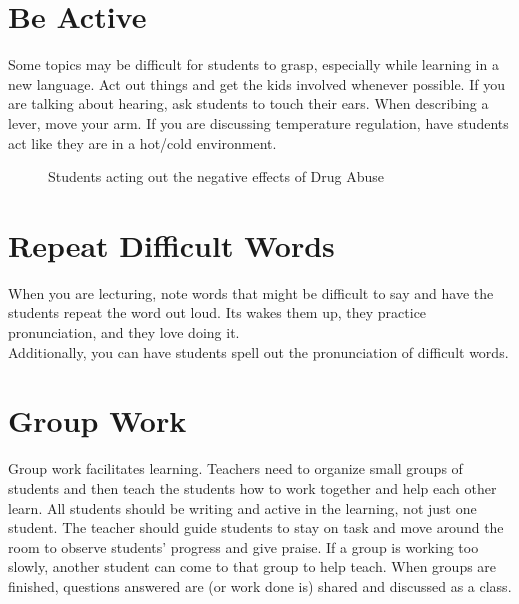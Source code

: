 \section{Be Active}
Some topics may be difficult for students to grasp, especially while learning in a new language.  Act out things and get the kids involved whenever possible.  If you are talking about hearing, ask students to touch their ears.  When describing a lever, move your arm.  If you are discussing temperature regulation, have students act like they are in a hot/cold environment.\\  

\begin{figure}[h!]
\centering
\setlength\fboxsep{0pt}
\setlength\fboxrule{2pt}
\caption{Students acting out the negative effects of Drug Abuse}
\end{figure}

\section{Repeat Difficult Words}
When you are lecturing, note words that might be difficult to say and have the students repeat the word out loud.  Its wakes them up, they practice pronunciation, and they love doing it.\\
Additionally, you can have students spell out the pronunciation of difficult words.

\section{Group Work}
Group work facilitates learning.  Teachers need to organize small groups of students and then teach the students how to work together and help each other learn. All students should be writing and active in the learning, not just one student.  The teacher should guide students to stay on task and move around the room to observe students' progress and give praise. If a group is working too slowly, another student can come to that group to help teach.  When groups are finished, questions answered are (or work done
is) shared and discussed as a class.\\

